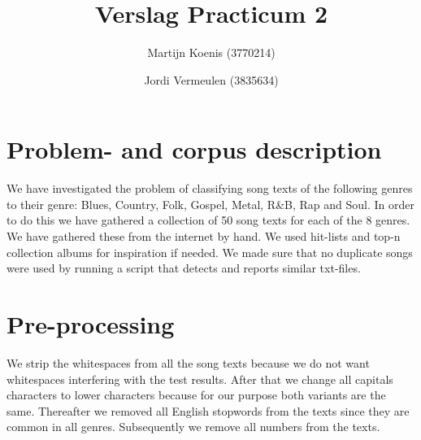 \documentclass[a4paper,oneside]{article}
\begin{document}
\title{Verslag Practicum 2}
\author{Martijn Koenis (3770214) \and Jordi Vermeulen (3835634)}
\date{}
\maketitle


\begin{abstract}
\end{abstract}


\section{Problem- and corpus description}
We have investigated the problem of classifying song texts of the following genres to their genre: Blues, Country, Folk, Gospel, Metal, R\&B, Rap and Soul.  In order to do this we have gathered a collection of 50 song texts for each of the 8 genres. We have gathered these from the internet by hand. We used hit-lists and top-n collection albums for inspiration if needed. We made sure that no duplicate songs were used by running a script that detects and reports similar txt-files. 

\section{Pre-processing}
We strip the whitespaces from all the song texts because we do not want whitespaces interfering with the test results. After that we change all capitals characters to lower characters because for our purpose both variants are the same. Thereafter we removed all English stopwords from the texts since they are common in all genres. Subsequently we remove all numbers from the texts.
\end{document}
